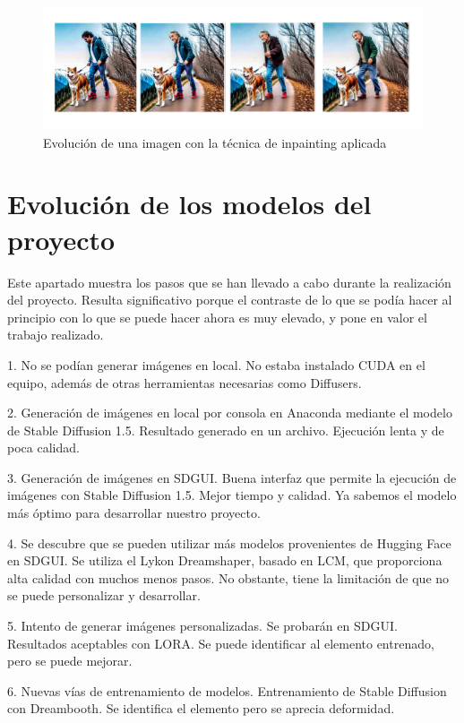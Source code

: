 \begin{figure}[h]
	\centering
	\includegraphics[width = 1.1
	\textwidth]{Imagenes/Vectorial/fasesinpainting.png}
	\caption{Evolución de una imagen con la técnica de inpainting aplicada}
	\label{fig:fasesinpainting}
\end{figure}

\section{Evolución de los modelos del proyecto}

Este apartado muestra los pasos que se han llevado a cabo durante la realización del proyecto. Resulta significativo porque el contraste de lo que se podía hacer al principio con lo que se puede hacer ahora es muy elevado, y pone en valor el trabajo realizado.

1. No se podían generar imágenes en local. No estaba instalado CUDA en el equipo, además de otras herramientas necesarias como Diffusers.

2. Generación de imágenes en local por consola en Anaconda mediante el modelo de Stable Diffusion 1.5. Resultado generado en un archivo. Ejecución lenta y de poca calidad.

3. Generación de imágenes en SDGUI. Buena interfaz que permite la ejecución de imágenes con Stable Diffusion 1.5. Mejor tiempo y calidad. Ya sabemos el modelo más óptimo para desarrollar nuestro proyecto.

4. Se descubre que se pueden utilizar más modelos provenientes de Hugging Face en SDGUI. Se utiliza el Lykon Dreamshaper, basado en LCM, que proporciona alta calidad con muchos menos pasos. No obstante, tiene la limitación de que no se puede personalizar y desarrollar.

5. Intento de generar imágenes personalizadas. Se probarán en SDGUI. Resultados aceptables con LORA. Se puede identificar al elemento entrenado, pero se puede mejorar.

6. Nuevas vías de entrenamiento de modelos. Entrenamiento de Stable Diffusion con Dreambooth. Se identifica el elemento pero se aprecia deformidad.

